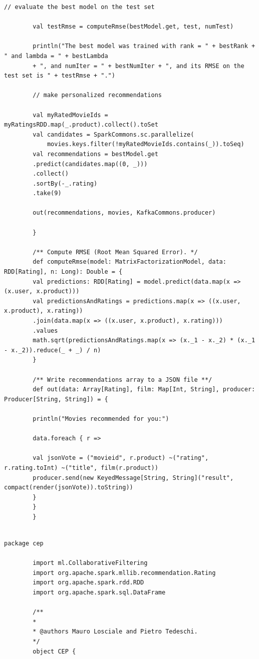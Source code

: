 \documentclass[11pt]{article}
\begin{document}
\begin{appendices}
\begin{lstlisting}[style=scalacode, caption=CollaborativeFiltering.scala]
		// evaluate the best model on the test set
		
		val testRmse = computeRmse(bestModel.get, test, numTest)
		
		println("The best model was trained with rank = " + bestRank + " and lambda = " + bestLambda
		+ ", and numIter = " + bestNumIter + ", and its RMSE on the test set is " + testRmse + ".")
		
		// make personalized recommendations
		
		val myRatedMovieIds = myRatingsRDD.map(_.product).collect().toSet
		val candidates = SparkCommons.sc.parallelize(
			movies.keys.filter(!myRatedMovieIds.contains(_)).toSeq)
		val recommendations = bestModel.get
		.predict(candidates.map((0, _)))
		.collect()
		.sortBy(-_.rating)
		.take(9)
		
		out(recommendations, movies, KafkaCommons.producer)
		
		}
		
		/** Compute RMSE (Root Mean Squared Error). */
		def computeRmse(model: MatrixFactorizationModel, data: RDD[Rating], n: Long): Double = {
		val predictions: RDD[Rating] = model.predict(data.map(x => (x.user, x.product)))
		val predictionsAndRatings = predictions.map(x => ((x.user, x.product), x.rating))
		.join(data.map(x => ((x.user, x.product), x.rating)))
		.values
		math.sqrt(predictionsAndRatings.map(x => (x._1 - x._2) * (x._1 - x._2)).reduce(_ + _) / n)
		}
		
		/** Write recommendations array to a JSON file **/
		def out(data: Array[Rating], film: Map[Int, String], producer: Producer[String, String]) = {
		
		println("Movies recommended for you:")
		
		data.foreach { r =>
		
		val jsonVote = ("movieid", r.product) ~("rating", r.rating.toInt) ~("title", film(r.product))
		producer.send(new KeyedMessage[String, String]("result", compact(render(jsonVote)).toString))
		}
		}
		}
		
	\end{lstlisting}
	\begin{lstlisting}[style=scalacode, caption=CEP.scala]
		package cep
		
		import ml.CollaborativeFiltering
		import org.apache.spark.mllib.recommendation.Rating
		import org.apache.spark.rdd.RDD
		import org.apache.spark.sql.DataFrame
		
		/**
		*
		* @authors Mauro Losciale and Pietro Tedeschi.
		*/
		object CEP {
		

\end{lstlisting}
\end{appendices}
\end{document}
